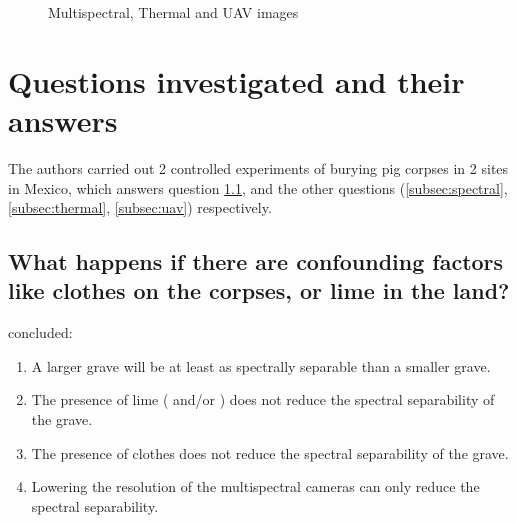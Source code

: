 \documentclass[12pt]{article}
\theoremstyle{plain}
\begin{document}
\begin{figure}[h]%
\centering
{}%
\quad
{}%
\quad
{}%
\caption{Multispectral, Thermal and UAV images \cite{SILVANCARDENAS2021111064}}
\end{figure}

\section{Questions investigated and their answers}
\label{sec:questions}
The authors carried out 2 controlled experiments of burying pig corpses in 2
sites in Mexico, which answers question \ref{subsec:confounding}, and the other
questions (\ref{subsec:spectral}, \ref{subsec:thermal}, \ref{subsec:uav})
respectively.


\subsection{What happens if there are confounding factors like clothes on the
  corpses, or lime in the land?}
\label{subsec:confounding}
\cite{SILVANCARDENAS2021111064} concluded:
\begin{enumerate}
  \item A larger grave will be at least as spectrally separable than a smaller
        grave.
  \item The presence of lime ( and/or ) does not reduce the
        spectral separability of the grave.
  \item The presence of clothes does not reduce the spectral separability of the
        grave.
  \item Lowering the resolution of the multispectral cameras can only reduce the
        spectral separability.
\end{enumerate}
\end{document}
